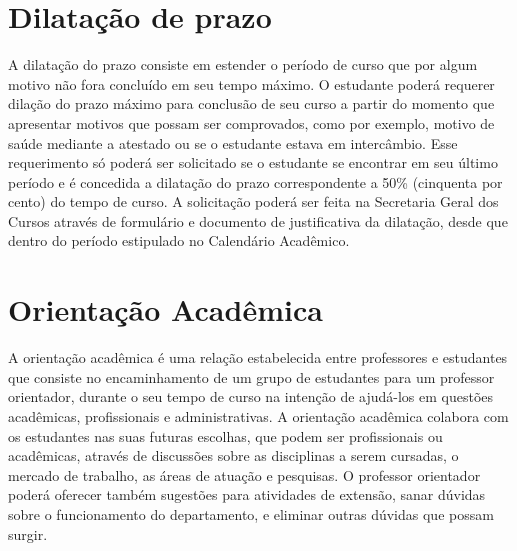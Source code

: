 \section{Dilatação de prazo}

A dilatação do prazo consiste em estender o período de curso que por algum motivo não fora concluído em seu tempo máximo. O estudante poderá requerer dilação do prazo máximo para conclusão de seu curso a partir do momento que apresentar motivos que possam ser comprovados, como por exemplo, motivo de saúde mediante a atestado ou se o estudante estava em intercâmbio. Esse requerimento só poderá ser solicitado se o estudante se encontrar em seu último período e é concedida a dilatação do prazo correspondente a 50\% (cinquenta por cento) do tempo de curso. A solicitação poderá ser feita na Secretaria Geral dos Cursos através de formulário e documento de justificativa da dilatação, desde que dentro do período estipulado no Calendário Acadêmico.

\section{Orientação Acadêmica}

A orientação acadêmica é uma relação estabelecida entre professores e estudantes que consiste no encaminhamento  de um grupo de estudantes para um professor orientador, durante o seu tempo de curso na intenção de ajudá-los em questões acadêmicas, profissionais e administrativas. A orientação acadêmica colabora com os estudantes nas suas futuras escolhas, que podem ser profissionais ou acadêmicas, através de discussões sobre as disciplinas a serem cursadas, o mercado de trabalho, as áreas de atuação e pesquisas. O professor orientador poderá oferecer também sugestões para atividades de extensão, sanar dúvidas sobre o funcionamento do departamento, e eliminar outras dúvidas que possam surgir.